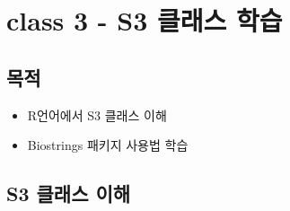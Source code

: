 \documentclass[
]{book}
\providecommand{\tightlist}{%
  \setlength{\itemsep}{0pt}\setlength{\parskip}{0pt}}
\begin{document}
\hypertarget{day2_class3}{%
\section{class 3 - S3 클래스 학습}\label{day2_class3}}

\hypertarget{day2_class3_objectives}{%
\subsection{목적}\label{day2_class3_objectives}}

\begin{itemize}
\tightlist
\item
  R언어에서 S3 클래스 이해
\item
  Biostrings 패키지 사용법 학습
\end{itemize}

\hypertarget{day2_class3_class}{%
\subsection{S3 클래스 이해}\label{day2_class3_class}}
\end{document}
